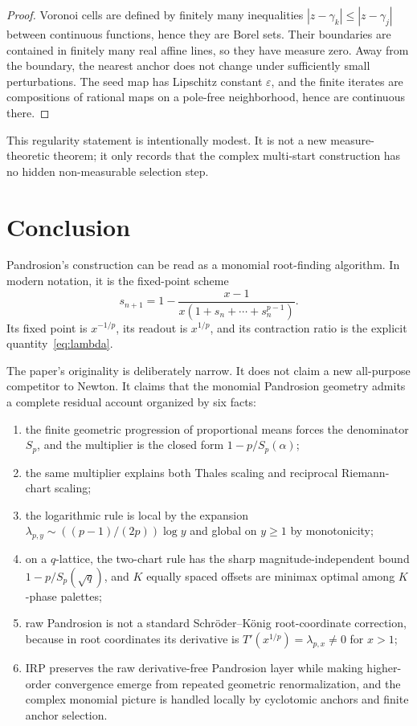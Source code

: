 \documentclass[10pt,a4paper]{article}
\theoremstyle{plain}
\theoremstyle{definition}
\theoremstyle{remark}
\newcommand{\eps}{\varepsilon}
\begin{document}
\begin{proof}
Voronoi cells are defined by finitely many inequalities
$|z-\gamma_k|\le |z-\gamma_j|$ between continuous functions, hence they are
Borel sets.  Their boundaries are contained in finitely many real affine lines,
so they have measure zero.  Away from the boundary, the nearest anchor does not
change under sufficiently small perturbations.  The seed map has Lipschitz
constant $\eps$, and the finite iterates are compositions of rational maps on a
pole-free neighborhood, hence are continuous there.
\end{proof}

This regularity statement is intentionally modest.  It is not a new
measure-theoretic theorem; it only records that the complex multi-start
construction has no hidden non-measurable selection step.

\section{Conclusion}
\label{sec:conclusion}

Pandrosion's construction can be read as a monomial root-finding algorithm.  In
modern notation, it is the fixed-point scheme
\[
  s_{n+1}=1-\frac{x-1}{x(1+s_n+\cdots+s_n^{p-1})}.
\]
Its fixed point is $x^{-1/p}$, its readout is $x^{1/p}$, and its contraction
ratio is the explicit quantity~\eqref{eq:lambda}.

The paper's originality is deliberately narrow.  It does not claim a new
all-purpose competitor to Newton.  It claims that the monomial Pandrosion
geometry admits a complete residual account organized by six facts:
\begin{enumerate}
  \item the finite geometric progression of proportional means forces the
  denominator $S_p$, and the multiplier is the closed form
  $1-p/S_p(\alpha)$;
  \item the same multiplier explains both Thales scaling and reciprocal
  Riemann-chart scaling;
  \item the logarithmic rule is local by the expansion
  $\lambda_{p,y}\sim ((p-1)/(2p))\log y$ and global on $y\ge1$ by
  monotonicity;
  \item on a $q$-lattice, the two-chart rule has the sharp
  magnitude-independent bound $1-p/S_p(\sqrt q)$, and $K$ equally spaced
  offsets are minimax optimal among $K$-phase palettes;
  \item raw Pandrosion is not a standard Schröder--König root-coordinate
  correction, because in root coordinates its derivative is
  $T'(x^{1/p})=\lambda_{p,x}\ne0$ for $x>1$;
  \item IRP preserves the raw derivative-free Pandrosion layer while making
  higher-order convergence emerge from repeated geometric renormalization, and
  the complex monomial picture is handled locally by cyclotomic anchors and
  finite anchor selection.
\end{enumerate}
\end{document}
